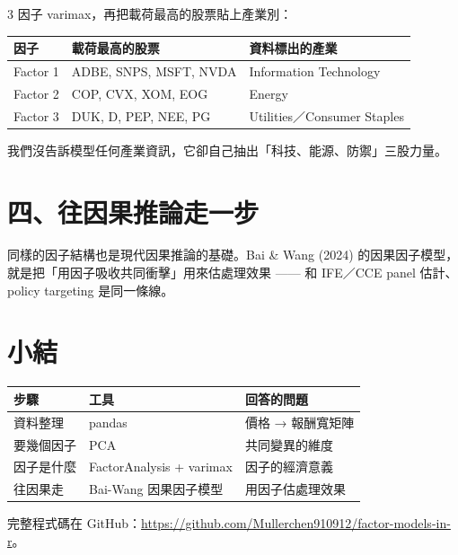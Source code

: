 \documentclass[12pt, a4paper]{article}
\begin{document}
3 因子 varimax，再把載荷最高的股票貼上產業別：

\begin{center}
\begin{tabular}{lll}
\toprule
因子 & 載荷最高的股票 & 資料標出的產業 \\
\midrule
Factor 1 & ADBE, SNPS, MSFT, NVDA & Information Technology \\
Factor 2 & COP, CVX, XOM, EOG & Energy \\
Factor 3 & DUK, D, PEP, NEE, PG & Utilities／Consumer Staples \\
\bottomrule
\end{tabular}
\end{center}

我們沒告訴模型任何產業資訊，它卻自己抽出「科技、能源、防禦」三股力量。

\section{四、往因果推論走一步}

同樣的因子結構也是現代因果推論的基礎。Bai \& Wang (2024) 的因果因子模型，就是把「用因子吸收共同衝擊」用來估處理效果 —— 和 IFE／CCE panel 估計、policy targeting 是同一條線。

\section{小結}

\begin{center}
\begin{tabular}{lll}
\toprule
步驟 & 工具 & 回答的問題 \\
\midrule
資料整理 & pandas & 價格 → 報酬寬矩陣 \\
要幾個因子 & PCA & 共同變異的維度 \\
因子是什麼 & FactorAnalysis + varimax & 因子的經濟意義 \\
往因果走 & Bai-Wang 因果因子模型 & 用因子估處理效果 \\
\bottomrule
\end{tabular}
\end{center}

完整程式碼在 GitHub：\url{https://github.com/Mullerchen910912/factor-models-in-r}。
\end{document}
